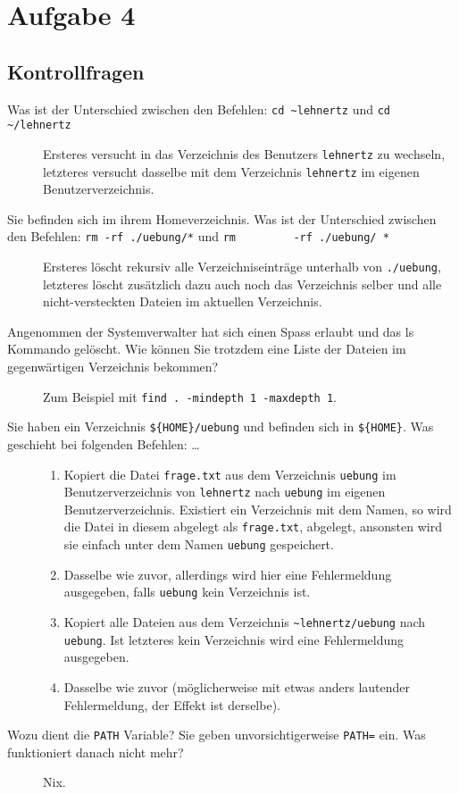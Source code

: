 \section{Aufgabe 4}
\subsection{Kontrollfragen}

\begin{description}
    \item[Was ist der Unterschied zwischen den Befehlen:
        \lstinline'cd ~lehnertz' und \lstinline'cd ~/lehnertz']
        Ersteres versucht in das Verzeichnis des Benutzers \verb'lehnertz' zu
        wechseln, letzteres versucht dasselbe mit dem Verzeichnis
        \verb'lehnertz' im eigenen Benutzerverzeichnis.
    \item[Sie befinden sich im ihrem Homeverzeichnis. Was ist der Unterschied
        zwischen den Befehlen: \lstinline'rm -rf ./uebung/*' und \lstinline'rm
        -rf ./uebung/ *']
        Ersteres l\"oscht rekursiv alle Verzeichniseintr\"age unterhalb von
        \verb'./uebung', letzteres l\"oscht zus\"atzlich dazu auch noch das
        Verzeichnis selber und alle nicht-versteckten Dateien im aktuellen
        Verzeichnis.
    \item[Angenommen der Systemverwalter hat sich einen Spass erlaubt und das ls
        Kommando gel\"oscht. Wie k\"onnen Sie trotzdem eine Liste der Dateien im
        gegenw\"artigen Verzeichnis bekommen?]
        Zum Beispiel mit \lstinline'find . -mindepth 1 -maxdepth 1'.
    \item[Sie haben ein Verzeichnis \lstinline'${HOME}/uebung' und befinden sich in
        \lstinline'${HOME}'.  Was geschieht bei folgenden Befehlen: \dots]
        \begin{enumerate}
            \item Kopiert die Datei \verb'frage.txt' aus dem Verzeichnis
                \verb'uebung' im Benutzerverzeichnis von \verb'lehnertz' nach
                \verb'uebung' im eigenen Benutzerverzeichnis. Existiert ein
                Verzeichnis mit dem Namen, so wird die Datei in diesem abgelegt
                als \verb'frage.txt', abgelegt, ansonsten wird sie einfach unter
                dem Namen \verb'uebung' gespeichert.
            \item Dasselbe wie zuvor, allerdings wird hier eine Fehlermeldung
                ausgegeben, falls \verb'uebung' kein Verzeichnis ist.
            \item Kopiert alle Dateien aus dem Verzeichnis
                \verb'~lehnertz/uebung' nach \verb'uebung'. Ist letzteres kein
                Verzeichnis wird eine Fehlermeldung ausgegeben.
            \item Dasselbe wie zuvor (m\"oglicherweise mit etwas anders
                lautender Fehlermeldung, der Effekt ist derselbe).
        \end{enumerate}
    \item[Wozu dient die \lstinline'PATH' Variable? Sie geben unvorsichtigerweise
        \lstinline'PATH=' ein. Was funktioniert danach nicht mehr?]
        Nix.
\end{description}
